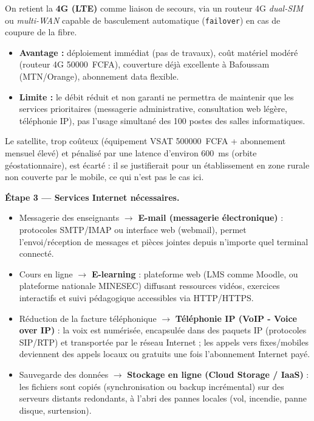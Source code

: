 \documentclass[11pt]{article}
\begin{document}
\begin{exoresolu}
On retient la \textbf{4G (LTE)} comme liaison de secours, via un routeur 4G \emph{dual-SIM} ou \emph{multi-WAN} capable de basculement automatique (\texttt{failover}) en cas de coupure de la fibre. 
\begin{itemize}
  \item \textbf{Avantage :} déploiement immédiat (pas de travaux), coût matériel modéré (routeur 4G \approx \num{50000}~FCFA), couverture déjà excellente à Bafoussam (MTN/Orange), abonnement data flexible.
  \item \textbf{Limite :} le débit réduit et non garanti ne permettra de maintenir que les services prioritaires (messagerie administrative, consultation web légère, téléphonie IP), pas l'usage simultané des 100 postes des salles informatiques.
\end{itemize}
Le satellite, trop coûteux (équipement VSAT \approx \num{500000}~FCFA + abonnement mensuel élevé) et pénalisé par une latence d'environ \SI{600}{ms} (orbite géostationnaire), est écarté : il se justifierait pour un établissement en zone rurale non couverte par le mobile, ce qui n'est pas le cas ici.

\textbf{Étape 3 — Services Internet nécessaires.}

\begin{itemize}
  \item Messagerie des enseignants $\rightarrow$ \textbf{E-mail (messagerie électronique)} : protocoles SMTP/IMAP ou interface web (webmail), permet l'envoi/réception de messages et pièces jointes depuis n'importe quel terminal connecté.
  \item Cours en ligne $\rightarrow$ \textbf{E-learning} : plateforme web (LMS comme Moodle, ou plateforme nationale MINESEC) diffusant ressources vidéos, exercices interactifs et suivi pédagogique accessibles via HTTP/HTTPS.
  \item Réduction de la facture téléphonique $\rightarrow$ \textbf{Téléphonie IP (VoIP - Voice over IP)} : la voix est numérisée, encapsulée dans des paquets IP (protocoles SIP/RTP) et transportée par le réseau Internet ; les appels vers fixes/mobiles deviennent des appels locaux ou gratuits une fois l'abonnement Internet payé.
  \item Sauvegarde des données $\rightarrow$ \textbf{Stockage en ligne (Cloud Storage / IaaS)} : les fichiers sont copiés (synchronisation ou backup incrémental) sur des serveurs distants redondants, à l'abri des pannes locales (vol, incendie, panne disque, surtension).
\end{itemize}


\end{exoresolu}
\end{document}
